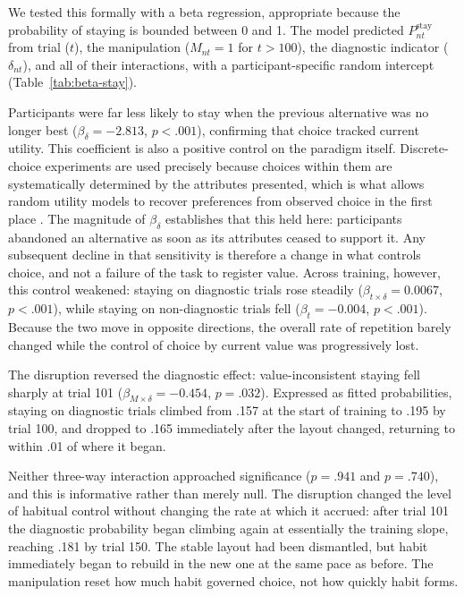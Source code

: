 \documentclass[man,natbib,floatsintext]{apa7}
\begin{document}
We tested this formally with a beta regression, appropriate because the probability of staying is bounded between 0 and 1. The model predicted $P^{\mathrm{stay}}_{nt}$ from trial ($t$), the manipulation ($M_{nt}=1$ for $t>100$), the diagnostic indicator ($\delta_{nt}$), and all of their interactions, with a participant-specific random intercept (Table~\ref{tab:beta-stay}).

Participants were far less likely to stay when the previous alternative was no longer best ($\beta_{\delta}=-2.813$, $p<.001$), confirming that choice tracked current utility. This coefficient is also a positive control on the paradigm itself. Discrete-choice experiments are used precisely because choices within them are systematically determined by the attributes presented, which is what allows random utility models to recover preferences from observed choice in the first place \citep{mcfadden1974,train2009}. The magnitude of $\beta_{\delta}$ establishes that this held here: participants abandoned an alternative as soon as its attributes ceased to support it. Any subsequent decline in that sensitivity is therefore a change in what controls choice, and not a failure of the task to register value. Across training, however, this control weakened: staying on diagnostic trials rose steadily ($\beta_{t \times \delta}=0.0067$, $p<.001$), while staying on non-diagnostic trials fell ($\beta_{t}=-0.004$, $p<.001$). Because the two move in opposite directions, the overall rate of repetition barely changed while the control of choice by current value was progressively lost.

The disruption reversed the diagnostic effect: value-inconsistent staying fell sharply at trial 101 ($\beta_{M \times \delta}=-0.454$, $p=.032$). Expressed as fitted probabilities, staying on diagnostic trials climbed from .157 at the start of training to .195 by trial 100, and dropped to .165 immediately after the layout changed, returning to within .01 of where it began.

Neither three-way interaction approached significance ($p=.941$ and $p=.740$), and this is informative rather than merely null. The disruption changed the level of habitual control without changing the rate at which it accrued: after trial 101 the diagnostic probability began climbing again at essentially the training slope, reaching .181 by trial 150. The stable layout had been dismantled, but habit immediately began to rebuild in the new one at the same pace as before. The manipulation reset how much habit governed choice, not how quickly habit forms.
\end{document}
